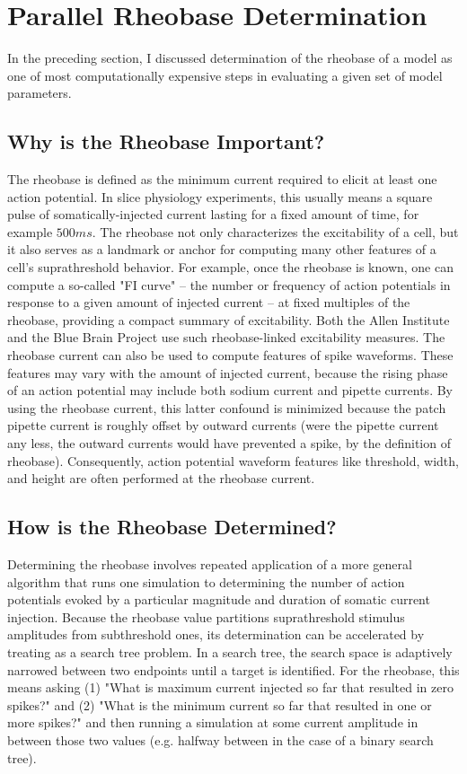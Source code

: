 \section{Parallel Rheobase Determination}\label{sec:parallel-rheobase}
In the preceding section, I discussed determination of the rheobase of a model as one of most computationally expensive steps in evaluating a given set of model parameters. 

\subsection{Why is the Rheobase Important?}
The rheobase is defined as the minimum current required to elicit at least one action potential.
In slice physiology experiments, this usually means a square pulse of somatically-injected current lasting for a fixed amount of time, for example $500 ms$.
The rheobase not only characterizes the excitability of a cell, but it also serves as a landmark or anchor for computing many other features of a cell's suprathreshold behavior.
For example, once the rheobase is known, one can compute a so-called "FI curve" -- the number or frequency of action potentials in response to a given amount of injected current -- at fixed multiples of the rheobase, providing a compact summary of excitability.
Both the Allen Institute and the Blue Brain Project use such rheobase-linked excitability measures.
The rheobase current can also be used to compute features of spike waveforms.
These features may vary with the amount of injected current, because the rising phase of an action potential may include both sodium current and pipette currents.
By using the rheobase current, this latter confound is minimized because the patch pipette current is roughly offset by outward currents (were the pipette current any less, the outward currents would have prevented a spike, by the definition of rheobase).
Consequently, action potential waveform features like threshold, width, and height are often performed at the rheobase current.

\subsection{How is the Rheobase Determined?}
Determining the rheobase involves repeated application of a more general algorithm that runs one simulation to determining the number of action potentials evoked by a particular magnitude and duration of somatic current injection.
Because the rheobase value partitions suprathreshold stimulus amplitudes from subthreshold ones, its determination can be accelerated by treating as a search tree problem.
In a search tree, the search space is adaptively narrowed between two endpoints until a target is identified.
For the rheobase, this means asking (1) "What is maximum current injected so far that resulted in zero spikes?" and (2) "What is the minimum current so far that resulted in one or more spikes?" and then running a simulation at some current amplitude in between those two values (e.g. halfway between in the case of a binary search tree).

